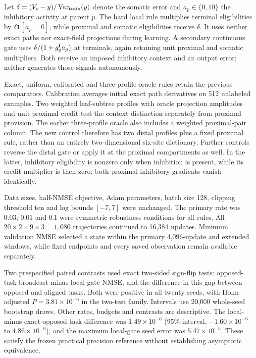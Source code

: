 Let $\delta=(V_s-y)/\operatorname{Var}_{\rm train}(y)$ denote the somatic error and $a_p\in\{0,10\}$ the inhibitory activity at parent $p$. The hard local rule multiplies terminal eligibilities by $\delta\bm1[a_p=0]$, while proximal and somatic eligibilities receive $\delta$. It uses neither exact paths nor exact-field projections during learning. A secondary continuous gate uses $\delta/(1+g_p^{\rm I}a_p)$ at terminals, again retaining unit proximal and somatic multipliers. Both receive an imposed inhibitory context and an output error; neither generates those signals autonomously.

Exact, uniform, calibrated and three-profile oracle rules retain the previous comparators. Calibration averages initial exact path derivatives on 512 unlabeled examples. Two weighted leaf-subtree profiles with oracle projection amplitudes and unit proximal credit test the context distinction separately from proximal provision. The earlier three-profile oracle also includes a weighted proximal-pair column. The new control therefore has two distal profiles plus a fixed proximal rule, rather than an entirely two-dimensional six-site dictionary. Further controls reverse the distal gate or apply it at the proximal compartments as well. In the latter, inhibitory eligibility is nonzero only when inhibition is present, while its credit multiplier is then zero; both proximal inhibitory gradients vanish identically.

Data sizes, half-NMSE objective, Adam parameters, batch size 128, clipping threshold ten and log bounds $[-7,7]$ were unchanged. The primary rate was 0.03; 0.01 and 0.1 were symmetric robustness conditions for all rules. All $20\times2\times9\times3=1,080$ trajectories continued to 16,384 updates. Minimum validation NMSE selected a state within the primary 4,096-update and extended windows, while fixed endpoints and every saved observation remain available separately.

Two prespecified paired contrasts used exact two-sided sign-flip tests: opposed-task broadcast-minus-local-gate NMSE, and the difference in this gap between opposed and aligned tasks. Both were positive in all twenty seeds, with Holm-adjusted $P=3.81\times10^{-6}$ in the two-test family. Intervals use 20,000 whole-seed bootstrap draws. Other rates, budgets and contrasts are descriptive. The local-minus-exact opposed-task difference was $1.49\times10^{-6}$ (95\% interval, $-1.60\times10^{-6}$ to $4.86\times10^{-6}$), and the maximum local-gate seed error was $5.47\times10^{-5}$. These satisfy the frozen practical precision reference without establishing asymptotic equivalence.

